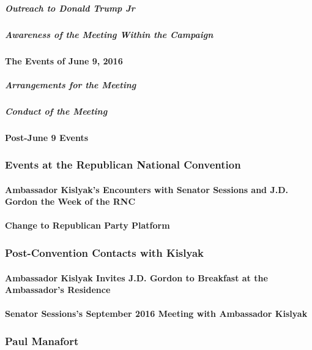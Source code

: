 \subparagraph{Outreach to Donald Trump Jr}

\subparagraph{Awareness of the Meeting Within the Campaign}

\paragraph{The Events of June 9, 2016}

\subparagraph{Arrangements for the Meeting}

\subparagraph{Conduct of the Meeting}

\paragraph{Post-June 9 Events}

\subsubsection{Events at the Republican National Convention}

\paragraph{Ambassador Kislyak's Encounters with Senator Sessions and J.D. Gordon the Week of the RNC}

\paragraph{Change to Republican Party Platform}

\subsubsection{Post-Convention Contacts with Kislyak}

\paragraph{Ambassador Kislyak Invites J.D. Gordon to Breakfast at the Ambassador's Residence}

\paragraph{Senator Sessions's September 2016 Meeting with Ambassador Kislyak}

\subsubsection{Paul Manafort}

